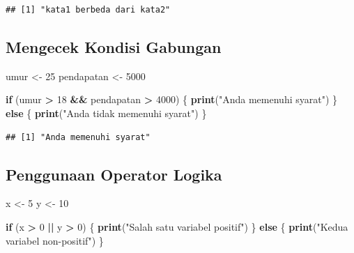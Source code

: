 \documentclass[
]{book}
\newenvironment{Shaded}{\begin{snugshade}}{\end{snugshade}}
\newcommand{\ControlFlowTok}[1]{\textcolor[rgb]{0.13,0.29,0.53}{\textbf{#1}}}
\newcommand{\DecValTok}[1]{\textcolor[rgb]{0.00,0.00,0.81}{#1}}
\newcommand{\FunctionTok}[1]{\textcolor[rgb]{0.13,0.29,0.53}{\textbf{#1}}}
\newcommand{\NormalTok}[1]{#1}
\newcommand{\OtherTok}[1]{\textcolor[rgb]{0.56,0.35,0.01}{#1}}
\newcommand{\SpecialCharTok}[1]{\textcolor[rgb]{0.81,0.36,0.00}{\textbf{#1}}}
\newcommand{\StringTok}[1]{\textcolor[rgb]{0.31,0.60,0.02}{#1}}
\begin{document}
\begin{verbatim}
## [1] "kata1 berbeda dari kata2"
\end{verbatim}

\hypertarget{mengecek-kondisi-gabungan}{%
\subsection{Mengecek Kondisi Gabungan}\label{mengecek-kondisi-gabungan}}

\begin{Shaded}
\begin{Highlighting}[]
\NormalTok{umur }\OtherTok{\textless{}{-}} \DecValTok{25}
\NormalTok{pendapatan }\OtherTok{\textless{}{-}} \DecValTok{5000}

\ControlFlowTok{if}\NormalTok{ (umur }\SpecialCharTok{\textgreater{}} \DecValTok{18} \SpecialCharTok{\&\&}\NormalTok{ pendapatan }\SpecialCharTok{\textgreater{}} \DecValTok{4000}\NormalTok{) \{}
  \FunctionTok{print}\NormalTok{(}\StringTok{"Anda memenuhi syarat"}\NormalTok{)}
\NormalTok{\} }\ControlFlowTok{else}\NormalTok{ \{}
  \FunctionTok{print}\NormalTok{(}\StringTok{"Anda tidak memenuhi syarat"}\NormalTok{)}
\NormalTok{\}}
\end{Highlighting}
\end{Shaded}

\begin{verbatim}
## [1] "Anda memenuhi syarat"
\end{verbatim}

\hypertarget{penggunaan-operator-logika}{%
\subsection{Penggunaan Operator Logika}\label{penggunaan-operator-logika}}

\begin{Shaded}
\begin{Highlighting}[]
\NormalTok{x }\OtherTok{\textless{}{-}} \DecValTok{5}
\NormalTok{y }\OtherTok{\textless{}{-}} \DecValTok{10}

\ControlFlowTok{if}\NormalTok{ (x }\SpecialCharTok{\textgreater{}} \DecValTok{0} \SpecialCharTok{||}\NormalTok{ y }\SpecialCharTok{\textgreater{}} \DecValTok{0}\NormalTok{) \{}
  \FunctionTok{print}\NormalTok{(}\StringTok{"Salah satu variabel positif"}\NormalTok{)}
\NormalTok{\} }\ControlFlowTok{else}\NormalTok{ \{}
  \FunctionTok{print}\NormalTok{(}\StringTok{"Kedua variabel non{-}positif"}\NormalTok{)}
\NormalTok{\}}
\end{Highlighting}
\end{Shaded}
\end{document}
